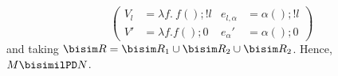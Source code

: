 \begin{example}
\[\begin{aligned}
   \end{aligned}\left(
\begin{aligned}
  V_l &=  \lambda f.\ f(); !l
&e_{l,\alpha} &=\alpha(); !l
  \\
V' &= \lambda f. f(); 0
&
e_\alpha' &=\alpha(); 0
\end{aligned}\right)
\]
and taking $\bisim R=\bisim R_1\cup\bisim R_2\cup\bisim R_2$. Hence, $M \bisimilPD N$.

\end{example}
